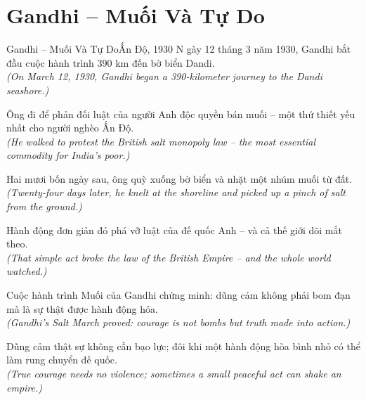 \section{Gandhi -- Muối Và Tự Do}
\begin{truyen}{Gandhi -- Muối Và Tự Do}{Ấn Độ, 1930}
N gày 12 tháng 3 năm 1930, Gandhi bắt đầu cuộc hành trình 390 km đến bờ biển Dandi.\\
\textit{(On March 12, 1930, Gandhi began a 390-kilometer journey to the Dandi seashore.)}

Ông đi để phản đối luật của người Anh độc quyền bán muối -- một thứ thiết yếu nhất cho người nghèo Ấn Độ.\\
\textit{(He walked to protest the British salt monopoly law -- the most essential commodity for India's poor.)}

Hai mươi bốn ngày sau, ông quỳ xuống bờ biển và nhặt một nhúm muối từ đất.\\
\textit{(Twenty-four days later, he knelt at the shoreline and picked up a pinch of salt from the ground.)}

Hành động đơn giản đó phá vỡ luật của đế quốc Anh -- và cả thế giới dõi mắt theo.\\
\textit{(That simple act broke the law of the British Empire -- and the whole world watched.)}

Cuộc hành trình Muối của Gandhi chứng minh: dũng cảm không phải bom đạn mà là sự thật được hành động hóa.\\
\textit{(Gandhi's Salt March proved: courage is not bombs but truth made into action.)}

\end{truyen}
\begin{baihoc}
  Dũng cảm thật sự không cần bạo lực; đôi khi một hành động hòa bình nhỏ có thể làm rung chuyển đế quốc.\\
  \textit{(True courage needs no violence; sometimes a small peaceful act can shake an empire.)}
\end{baihoc}

